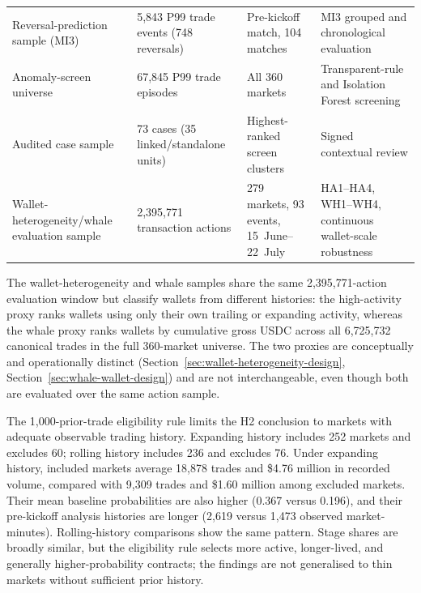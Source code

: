 \begin{table}[htbp]
\begin{tabular}{p{}p{}p{}p{}}
Reversal-prediction sample (MI3) & 5,843 P99 trade events (748 reversals) & Pre-kickoff match, 104 matches & MI3 grouped and chronological evaluation \\
Anomaly-screen universe & 67,845 P99 trade episodes & All 360 markets & Transparent-rule and Isolation Forest screening \\
Audited case sample & 73 cases (35 linked/standalone units) & Highest-ranked screen clusters & Signed contextual review \\
Wallet-heterogeneity/whale evaluation sample & 2,395,771 transaction actions & 279 markets, 93 events, 15~June--22~July & HA1--HA4, WH1--WH4, continuous wallet-scale robustness \\
\bottomrule
\end{tabular}
\end{table}

The wallet-heterogeneity and whale samples share the same 2,395,771-action
evaluation window but classify wallets from different histories: the
high-activity proxy ranks wallets using only their own trailing or expanding
activity, whereas the whale proxy ranks wallets by cumulative gross USDC
across all 6,725,732 canonical trades in the full 360-market universe. The
two proxies are conceptually and operationally distinct (Section~\ref{sec:wallet-heterogeneity-design}, Section~\ref{sec:whale-wallet-design})
and are not interchangeable, even though both are evaluated over the same
action sample.

The 1,000-prior-trade eligibility rule limits the H2 conclusion to markets with
adequate observable trading history. Expanding history includes 252 markets and
excludes 60; rolling history includes 236 and excludes 76. Under expanding
history, included markets average 18,878 trades and \$4.76 million in recorded
volume, compared with 9,309 trades and \$1.60 million among excluded markets.
Their mean baseline probabilities are also higher (0.367 versus 0.196), and
their pre-kickoff analysis histories are longer (2,619 versus 1,473 observed
market-minutes). Rolling-history comparisons show the same pattern. Stage shares
are broadly similar, but the eligibility rule selects more active, longer-lived,
and generally higher-probability contracts; the findings are not generalised to
thin markets without sufficient prior history.
